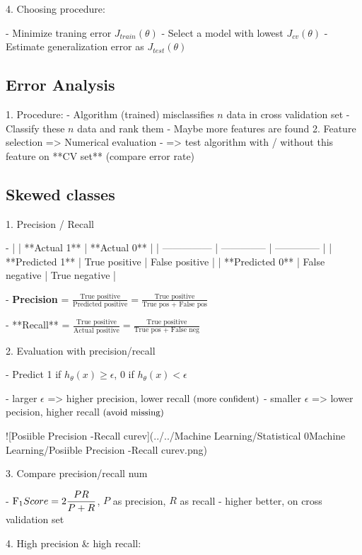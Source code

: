 4. Choosing procedure:

- Minimize traning error $J_{train}(\theta)$ 
- Select a model with lowest $J_{cv}(\theta)$ 
- Estimate generalization error as $J_{test}(\theta)$ 

\subsection{Error Analysis}

1. Procedure:
- Algorithm (trained) misclassifies $n$ data in cross validation set
- Classify these $n$ data and rank them
- Maybe more features are found
2. Feature selection => Numerical evaluation
- => test algorithm with / without this feature on **CV set** (compare error rate)

\subsection{Skewed classes}

1. Precision / Recall

- |                 | **Actual 1**   | **Actual 0**   |
| --------------- | -------------- | -------------- |
| **Predicted 1** | True positive  | False positive |
| **Predicted 0** | False negative | True negative  |

- \textbf{Precision} = $\displaystyle \frac{\text {True positive}}{\text{Predicted positive}} = \frac{\text {True positive}}{\text{True pos + False pos}}$

- **Recall** = $\displaystyle \frac{\text{True positive}}{\text{Actual positive}} = \frac{\text{True positive}}{\text{True pos + False neg}}$

2. Evaluation with precision/recall

- Predict 1 if $ h_\theta(x) \geq \epsilon$, 0 if $h_\theta(x) < \epsilon$

- larger $\epsilon$ => higher precision, lower recall $\small \text{(more confident)}$ 
- smaller $\epsilon$ => lower pecision, higher recall $\small \text{(avoid missing)}$       

![Posiible Precision -Recall curev](../../Machine Learning/Statistical 0Machine Learning/Posiible Precision -Recall curev.png)  

3. Compare precision/recall num

- $\displaystyle \text{F}_1 \space  Score = 2\frac{PR}{P+R}$, $P$ as precision, $R$ as recall
- higher better, on cross validation set

4. High precision \& high recall:

